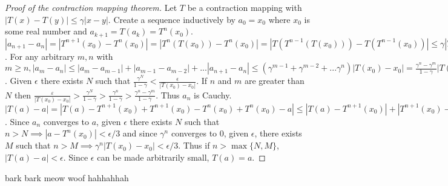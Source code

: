 \documentclass{article}
\newcommand{\eps}{\varepsilon}
\begin{document}
\begin{proof}[Proof of the contraction mapping theorem]
Let $T$ be a contraction mapping with $|T(x)-T(y)|\leq\gamma|x-y|$. Create a sequence inductively by $a_0=x_0$ where $x_0$ is some real number and $a_{k+1}=T(a_k)=T^n(x_0)$. $|a_{n+1}-a_n|=|T^{n+1}(x_0)-T^n(x_0)|=|T^n(T(x_0))-T^n(x_0)|=|T(T^{n-1}(T(x_0)))-T(T^{n-1}(x_0))|\leq\gamma|T^{n-1}(T(x_0))-T^{n-1}(x_0)|\leq\gamma^n|T(x_0)-x_0|$. For any arbitrary $m,n$ with $m\geq n, |a_m-a_n|\leq|a_m-a_{m-1}|+|a_{m-1}-a_{m-2}|+...|a_{n+1}-a_n|\leq(\gamma^{m-1}+\gamma^{m-2}+...\gamma^{n})|T(x_0)-x_0|=\frac{\gamma^n-\gamma^m}{1-\gamma}|T(x_0)-x_0|$. Given $\epsilon$ there exists $N$ such that $\frac{\gamma^{N}}{1-\gamma}<\frac{\epsilon}{|T(x_0)-x_0|}$. If $n$ and $m$ are greater than $N$ then $\frac{\eps}{|T(x_0)-x_0|}>\frac{\gamma^{N}}{1-\gamma}>\frac{\gamma^n}{1-\gamma}>\frac{\gamma^n-\gamma^m}{1-\gamma}$. Thus $a_n$ is Cauchy. $|T(a)-a|=|T(a)-T^{n+1}(x_0)+T^{n+1}(x_0)-T^n(x_0)+T^n(x_0)-a|\leq|T(a)-T^{n+1}(x_0)|+|T^{n+1}(x_0)-T^n(x_0)|+|T^n(x_0)-a|<2|a-T^n(x_0)|+|T^{n+1}(x_0)-T^n(x_0)|\leq 2|a-T^n(x_0)|+\gamma^n|T(x_0)-x_0|$. Since $a_n$ converges to $a$, given $\epsilon$ there exists $N$ such that $n>N\implies |a-T^n(x_0)|<\epsilon/3$ and since $\gamma^n$ converges to 0, given $\epsilon$, there exists $M$ such that $n>M\implies \gamma^n|T(x_0)-x_0|<\epsilon/3$. Thus if $n>\max\{N,M\}$, $|T(a)-a|<\epsilon$. Since $\epsilon$ can be made arbitrarily small, $T(a)=a$.
\end{proof}
bark bark meow woof
hahhahhah
\end{document}
